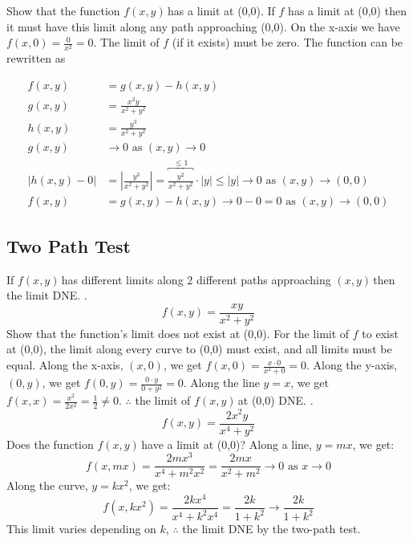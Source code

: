 \documentclass{article}
\newcommand{\n}{\leavevmode \newline} %
\newcommand{\nn}{\leavevmode \newline \newline} %
\newcommand{\xy}{$(x,y)\,$} %
\newcommand{\fxy}{$f(x,y)\,$} %
\newcommand{\as}{\text{ as }} %
\numberwithin{equation}{subsection} %
\begin{document}
Show that the function \fxy has a limit at (0,0). If $f$ has a limit at (0,0) then it must have this limit along any path approaching (0,0).
\nn
On the x-axis we have $f(x,0)=\frac{0}{x^2}=0$. The limit of $f$ (if it exists) must be zero. The function can be rewritten as

\begin{equation}
    \begin{split}
        f(x,y)&=g(x,y)-h(x,y)\\
        g(x,y)&=\frac{x^2y}{x^2+y^2}\\
        h(x,y)&=\frac{y^3}{x^2+y^2}\\
        g(x,y)&\rightarrow 0 \as (x,y)\rightarrow 0\\
        |h(x,y)-0|&=\left|\frac{y^3}{x^2+y^2}\right|=\overbracket{\frac{y^2}{x^2+y^2}}^{\leq 1}\cdot|y|\leq|y|\rightarrow0\as(x,y)\rightarrow(0,0)\\
        f(x,y)&=g(x,y)-h(x,y)\rightarrow 0-0=0 \as (x,y)\rightarrow (0,0)
    \end{split}
\end{equation}

\subsection{Two Path Test}
If \fxy has different limits along 2 different paths approaching \xy then the limit DNE.
\nn
{}.
\begin{equation}
    f(x,y)=\frac{xy}{x^2+y^2}
\end{equation}
\n
Show that the function's limit does not exist at (0,0). For the limit of $f$ to exist at (0,0), the limit along every curve to (0,0) must exist, and all limits must be equal.
\nn
Along the x-axis, $(x,0)$, we get $f(x,0)=\frac{x\cdot0}{x^2+0}=0$.
\nn
Along the y-axis, $(0,y)$, we get $f(0,y)=\frac{0\cdot y}{0+y^2}=0$.
\nn
Along the line $y=x$, we get $f(x,x)=\frac{x^2}{2x^2}=\frac{1}{2}\neq0$. $\therefore$ the limit of \fxy at (0,0) DNE.
\nn
{}.
\begin{equation}
    f(x,y)=\frac{2x^2y}{x^4+y^2}
\end{equation}
\n
Does the function \fxy have a limit at (0,0)?
\nn
Along a line, $y=mx$, we get:
\begin{equation}
    f(x,mx)=\frac{2mx^3}{x^4+m^2x^2}=\frac{2mx}{x^2+m^2}\rightarrow0 \as x\rightarrow 0
\end{equation}
\n
Along the curve, $y=kx^2$, we get:
\begin{equation}
    f(x,kx^2)=\frac{2kx^4}{x^4+k^2x^4}=\frac{2k}{1+k^2}\rightarrow\frac{2k}{1+k^2}
\end{equation}
\n
This limit varies depending on $k$, $\therefore$ the limit DNE by the two-path test.
\end{document}
